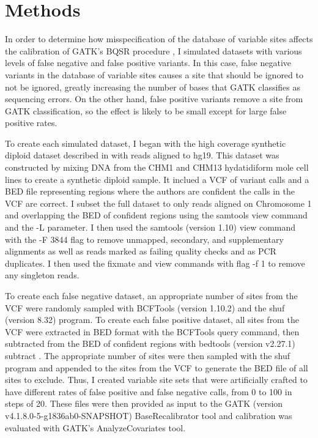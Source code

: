 \section{Methods}

In order to determine how misspecification of the database of variable sites affects the calibration of GATK's BQSR procedure \parencite{auwera_fastq_2013}, I simulated datasets with various levels of false negative and false positive variants. In this case, false negative variants in the database of variable sites causes a site that should be ignored to not be ignored, greatly increasing the number of bases that GATK classifies as sequencing errors. On the other hand, false positive variants remove a site from GATK classification, so the effect is likely to be small except for large false positive rates.

To create each simulated dataset, I began with the high coverage synthetic diploid dataset described in \textcite{li_synthetic-diploid_2018} with reads aligned to hg19. This dataset was constructed by mixing DNA from the CHM1 and CHM13 hydatidiform mole cell lines to create a synthetic diploid sample. It inclued a VCF of variant calls and a BED file representing regions where the authors are confident the calls in the VCF are correct. I subset the full dataset to only reads aligned on Chromosome 1 and overlapping the BED of confident regions using the samtools view command \parencite{li_sequence_2009} and the -L parameter. I then used the samtools (version 1.10) view command with the -F 3844 flag to remove unmapped, secondary, and supplementary alignments as well as reads marked as failing quality checks and as PCR duplicates. I then used the fixmate and view commands with flag -f 1 to remove any singleton reads.

To create each false negative dataset, an appropriate number of sites from the VCF were randomly sampled with BCFTools (version 1.10.2) and the shuf (version 8.32) program. To create each false positive dataset, all sites from the VCF were extracted in BED format with the BCFTools query command, then subtracted from the BED of confident regions with bedtools (version v2.27.1) subtract \parencite{quinlan_bedtools_2010}. The appropriate number of sites were then sampled with the shuf program and appended to the sites from the VCF to generate the BED file of all sites to exclude. Thus, I created variable site sets that were artificially crafted to have different rates of false positive and false negative calls, from 0 to 100 in steps of 20.
These files were then provided as input to the GATK (version v4.1.8.0-5-g1836ab0-SNAPSHOT) BaseRecalibrator tool and calibration was evaluated with GATK's AnalyzeCovariates tool.

